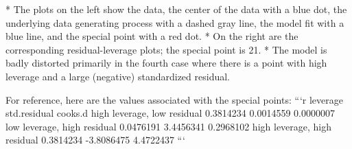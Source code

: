 * The plots on the left show the data, the center of the data  with a blue dot, the underlying data generating process with a dashed gray line, the model fit with a blue line, and the special point with a red dot. 
* On the right are the corresponding residual-leverage plots; the special point is 21. 
* The model is badly distorted primarily in the fourth case where there is a point with high leverage and a large (negative) standardized residual. 


\newpage
For reference, here are the values associated with the special points:
```{r}
                               leverage std.residual   cooks.d
high leverage,  low residual  0.3814234    0.0014559 0.0000007
low leverage,  high residual  0.0476191    3.4456341 0.2968102
high leverage, high residual  0.3814234   -3.8086475 4.4722437
```

